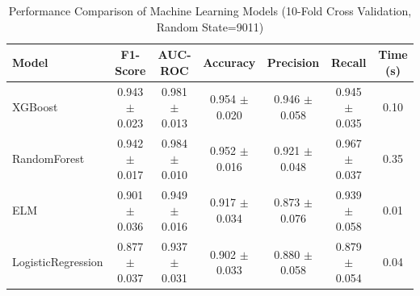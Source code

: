 \begin{table}[htbp]
\centering
\caption{Performance Comparison of Machine Learning Models (10-Fold Cross Validation, Random State=9011)}
\label{tab:model_comparison}
\begin{tabular}{lcccccc}
\toprule
\textbf{Model} & \textbf{F1-Score} & \textbf{AUC-ROC} & \textbf{Accuracy} & \textbf{Precision} & \textbf{Recall} & \textbf{Time (s)} \\
\midrule
XGBoost & 0.943 $\pm$ 0.023 & 0.981 $\pm$ 0.013 & 0.954 $\pm$ 0.020 & 0.946 $\pm$ 0.058 & 0.945 $\pm$ 0.035 & 0.10 \\
RandomForest & 0.942 $\pm$ 0.017 & 0.984 $\pm$ 0.010 & 0.952 $\pm$ 0.016 & 0.921 $\pm$ 0.048 & 0.967 $\pm$ 0.037 & 0.35 \\
ELM & 0.901 $\pm$ 0.036 & 0.949 $\pm$ 0.016 & 0.917 $\pm$ 0.034 & 0.873 $\pm$ 0.076 & 0.939 $\pm$ 0.058 & 0.01 \\
LogisticRegression & 0.877 $\pm$ 0.037 & 0.937 $\pm$ 0.031 & 0.902 $\pm$ 0.033 & 0.880 $\pm$ 0.058 & 0.879 $\pm$ 0.054 & 0.04 \\
\bottomrule
\end{tabular}
\end{table}